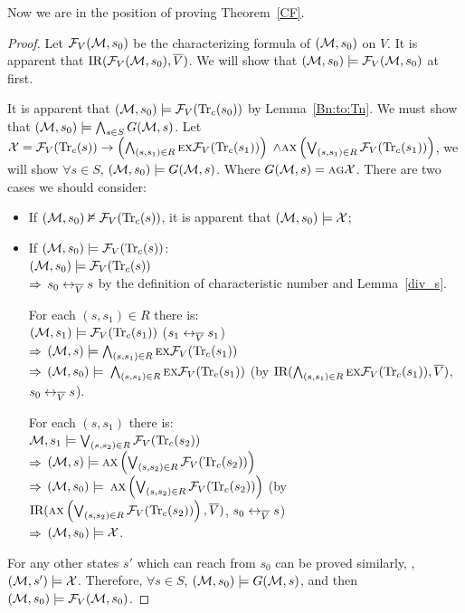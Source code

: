 \documentclass{article}
\begin{document}
Now we are in the position of proving Theorem~\ref{CF}.\\
\begin{proof}
Let ${\cal F}_V({\cal M}, s_0)$ be the characterizing formula of $({\cal M}, s_0)$ on $V$.
It is apparent that $\textrm{IR}({\cal F}_V({\cal M}, s_0), \overline V)$. We will show that $({\cal M}, s_0) \models {\cal F}_V({\cal M}, s_0)$ at first.

It is apparent that $({\cal M}, s_0) \models {\cal F}_V(\textrm{Tr}_c(s_0))$ by Lemma~\ref{Bn:to:Tn}.
We must show that $({\cal M}, s_0) \models \bigwedge_{s\in S} G({\cal M}, s)$.
Let ${\cal X} = {\cal F}_V(\textrm{Tr}_c(s)) \rightarrow \left(\bigwedge_{(s,s_1) \in R} \textsc{e} \textsc{x} {\cal F}_V(\textrm{Tr}_c(s_1))\right)$ $\wedge \textsc{a} \textsc{x} \left(\bigvee_{(s,s_1) \in R} {\cal F}_V(\textrm{Tr}_c(s_1))\right)$, we will show $\forall s\in S$, $({\cal M}, s_0) \models G({\cal M}, s)$. Where $G({\cal M}, s)=\textsc{a}\textsc{g} \cal X$.
There are two cases we should consider:
\begin{itemize}
  \item  If $({\cal M}, s_0) \nvDash {\cal F}_V(\textrm{Tr}_c(s))$, it is apparent that $({\cal M}, s_0) \models {\cal X}$;
  \item  If $({\cal M}, s_0) \models {\cal F}_V(\textrm{Tr}_c(s))$:\\
         $({\cal M}, s_0) \models {\cal F}_V(\textrm{Tr}_c(s))$\\
        $\Rightarrow$  $s_0 \leftrightarrow_{\overline V} s$ by the definition of characteristic number and Lemma~\ref{div_s}.

        For each $(s, s_1)\in R$ there is:\\
         $({\cal M}, s_1) \models {\cal F}_V(\textrm{Tr}_c(s_1))$  \hfill  ($s_1 \leftrightarrow_{\overline V} s_1$)\\
        $\Rightarrow$ $({\cal M}, s) \models \bigwedge_{(s,s_1)\in R}\textsc{e} \textsc{x} {\cal F}_V(\textrm{Tr}_c(s_1))$\\
        $\Rightarrow$ $({\cal M}, s_0) \models$ $\bigwedge_{(s,s_1)\in R}\textsc{e} \textsc{x} {\cal F}_V(\textrm{Tr}_c(s_1))$    \qquad  (by $\textrm{IR}(\bigwedge_{(s,s_1)\in R}\textsc{e} \textsc{x} {\cal F}_V(\textrm{Tr}_c(s_1)), \overline V)$, $s_0 \leftrightarrow_{\overline V} s$).

         For each $(s, s_1)$ there is:\\
          ${\cal M}, s_1 \models \bigvee_{(s, s_2)\in R}{\cal F}_V(\textrm{Tr}_c(s_2))$\\
        $\Rightarrow$ $({\cal M}, s) \models \textsc{a} \textsc{x} \left( \bigvee_{(s, s_2)\in R} {\cal F}_V(\textrm{Tr}_c(s_2)) \right)$ \\
        $\Rightarrow$ $({\cal M}, s_0) \models$  $\textsc{a} \textsc{x} \left( \bigvee_{(s, s_2)\in R} {\cal F}_V(\textrm{Tr}_c(s_2)) \right)$   \qquad  (by $\textrm{IR}(\textsc{a} \textsc{x} \left( \bigvee_{(s, s_2)\in R} {\cal F}_V(\textrm{Tr}_c(s_2)) \right), \overline V)$, $s_0 \leftrightarrow_{\overline V} s$)\\
        $\Rightarrow$ $({\cal M}, s_0) \models {\cal X}$.\\
\end{itemize}
For any other states $s'$ which can reach from $s_0$ can be proved similarly, \ie, $({\cal M},s')\models \cal X$.
Therefore, $\forall s\in S$, $({\cal M}, s_0) \models G({\cal M}, s)$, and then $({\cal M}, s_0) \models {\cal F}_V({\cal M}, s_0)$.



\end{proof}
\end{document}
